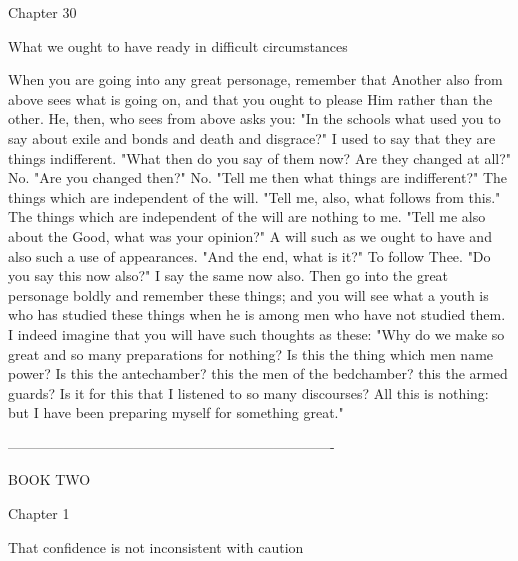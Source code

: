 \documentclass[a4paper]{article}
\begin{document}
Chapter 30

What we ought to have ready in difficult circumstances

    When you are going into any great personage, remember that Another also
from above sees what is going on, and that you ought to please Him rather than
the other. He, then, who sees from above asks you: "In the schools what used
you to say about exile and bonds and death and disgrace?" I used to say that
they are things indifferent. "What then do you say of them now? Are they
changed at all?" No. "Are you changed then?" No. "Tell me then what things are
indifferent?" The things which are independent of the will. "Tell me, also,
what follows from this." The things which are independent of the will are
nothing to me. "Tell me also about the Good, what was your opinion?" A will
such as we ought to have and also such a use of appearances. "And the end, what
is it?" To follow Thee. "Do you say this now also?" I say the same now also.
    Then go into the great personage boldly and remember these things; and you
will see what a youth is who has studied these things when he is among men who
have not studied them. I indeed imagine that you will have such thoughts as
these: "Why do we make so great and so many preparations for nothing? Is this
the thing which men name power? Is this the antechamber? this the men of the
bedchamber? this the armed guards? Is it for this that I listened to so many
discourses? All this is nothing: but I have been preparing myself for something
great."

----------------------------------------------------------------------

BOOK TWO

Chapter 1

That confidence is not inconsistent with caution
\end{document}
